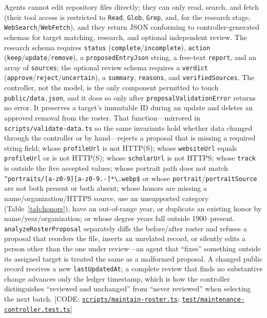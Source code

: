 \documentclass[11pt]{article}
\newcommand{\code}[1]{\texttt{\small #1}}
\newcommand{\ghrepo}{https://github.com/dynaroars/vietprofs}
\newcommand{\codelink}[1]{\href{\ghrepo/blob/main/#1}{\code{#1}}}
\begin{document}
Agents cannot edit repository files directly; they can only read, search, and fetch (their tool access is restricted to \code{Read}, \code{Glob}, \code{Grep}, and, for the research stage, \code{WebSearch}/\code{WebFetch}), and they return JSON conforming to controller-generated schemas for target matching, research, and optional independent review.
The research schema requires \code{status} (\code{complete}/\code{incomplete}), \code{action} (\code{keep}/\code{update}/\code{remove}), a \code{proposedEntryJson} string, a free-text \code{report}, and an array of \code{sources}; the optional review schema requires a \code{verdict} (\code{approve}/\code{reject}/\code{uncertain}), a \code{summary}, \code{reasons}, and \code{verifiedSources}.
The controller, not the model, is the only component permitted to touch \code{public/data.json}, and it does so only after \code{proposalValidationError} returns no error. It preserves a target's immutable ID during an update and deletes an approved removal from the roster.
That function---mirrored in \code{scripts/validate-data.ts} so the same invariants hold whether data changed through the controller or by hand---rejects a proposal that is missing a required string field; whose \code{profileUrl} is not HTTP(S); whose \code{websiteUrl} equals \code{profileUrl} or is not HTTP(S); whose \code{scholarUrl} is not HTTPS; whose \code{track} is outside the five accepted values; whose portrait path does not match \verb|^portraits/[a-z0-9][a-z0-9.-]*\.webp$| or whose \code{portrait}/\code{portraitSource} are not both present or both absent; whose honors are missing a name/organization/HTTPS source, use an unsupported category (Table~\ref{tab:honors}), have an out-of-range year, or duplicate an existing honor by name/year/organization; or whose degree years fall outside 1900--present.
\code{analyzeRosterProposal} separately diffs the before/after roster and refuses a proposal that reorders the file, inserts an unrelated record, or silently edits a person other than the one under review---an agent that ``fixes'' something outside its assigned target is treated the same as a malformed proposal.
A changed public record receives a new \code{lastUpdatedAt}; a complete review that finds no substantive change advances only the ledger timestamp, which is how the controller distinguishes ``reviewed and unchanged'' from ``never reviewed'' when selecting the next batch.
[CODE: \codelink{scripts/maintain-roster.ts}; \codelink{test/maintenance-controller.test.ts}]
\end{document}
